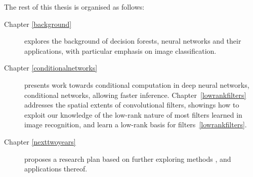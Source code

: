\documentclass[thesis]{subfiles}
\begin{document}
The rest of this thesis is organised as follows:
\begin{description}
	\item[Chapter \ref{background}] explores the background of decision forests, neural networks and their applications, with particular emphasis on image classification.
	\item[Chapter \ref{conditionalnetworks}] presents work towards conditional computation in deep neural networks, conditional networks, allowing faster inference. Chapter~\ref{lowrankfilters} addresses the spatial extents of convolutional filters, showings how to exploit our knowledge of the low-rank nature of most filters learned in image recognition, and learn a low-rank basis for filters~\ref{lowrankfilters}.
	\item[Chapter \ref{nexttwoyears}] proposes a research plan based on further exploring methods , and applications thereof.
\end{description}
\end{document}
